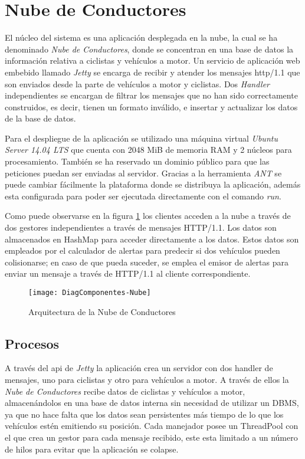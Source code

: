 \section{Nube de Conductores}\label{section:NubeConductores}
El núcleo del sistema es una aplicación desplegada en la nube, la cual se ha
denominado \emph{Nube de Conductores}, donde se concentran en una base de datos
la información relativa a ciclistas y vehículos a motor. Un servicio de aplicación
web embebido llamado \emph{Jetty} se encarga de recibir y atender los mensajes
\Gls{http/1.1} que son enviados desde la parte de vehículos a motor y ciclistas.
Dos \emph{Handler} independientes se encargan de filtrar los mensajes que no han
sido correctamente construidos, es decir, tienen un formato inválido, e insertar
y actualizar los datos de la base de datos.

Para el despliegue de la aplicación se utilizado una máquina virtual \emph{Ubuntu Server
14.04 LTS} que cuenta con 2048 MiB de memoria RAM y 2 núcleos para procesamiento.
También se ha reservado un dominio público para que las peticiones puedan ser enviadas
al servidor. Gracias a la herramienta \emph{ANT} se puede cambiar fácilmente la plataforma
donde se distribuya la aplicación, además esta configurada para poder ser ejecutada
directamente con el comando \emph{run}.

Como puede observarse en la figura \ref{fig:DiagComponentes-Nube} los clientes acceden
a la nube a través de dos gestores independientes a través de mensajes HTTP/1.1. Los datos
son almacenados en HashMap para acceder directamente a los datos. Estos datos son
empleados por el calculador de alertas para predecir si dos vehículos pueden colisionarse; en
caso de que pueda suceder, se emplea el emisor de alertas para enviar un mensaje a través
de HTTP/1.1 al cliente correspondiente.

\begin{figure}[H]
	\begin{center}
		\texttt{[image: DiagComponentes-Nube]}
		\caption{Arquitectura de la Nube de Conductores}
		\label{fig:DiagComponentes-Nube}
	\end{center}
\end{figure}

\subsection{Procesos}\label{ssection:procesos}
A través del \gls{api} de \emph{Jetty} la aplicación crea un servidor con dos handler
de mensajes, uno para ciclistas y otro para vehículos a motor. A través de ellos la
\emph{Nube de Conductores} recibe datos de ciclistas y vehículos a motor, almacenándolos
en una base de datos interna sin necesidad de utilizar un DBMS, ya que no hace falta
que los datos sean persistentes más tiempo de lo que los vehículos estén emitiendo
su posición. Cada manejador posee un ThreadPool con el que crea un gestor para cada
mensaje recibido, este esta limitado a un número de hilos para evitar que la aplicación
se colapse.


